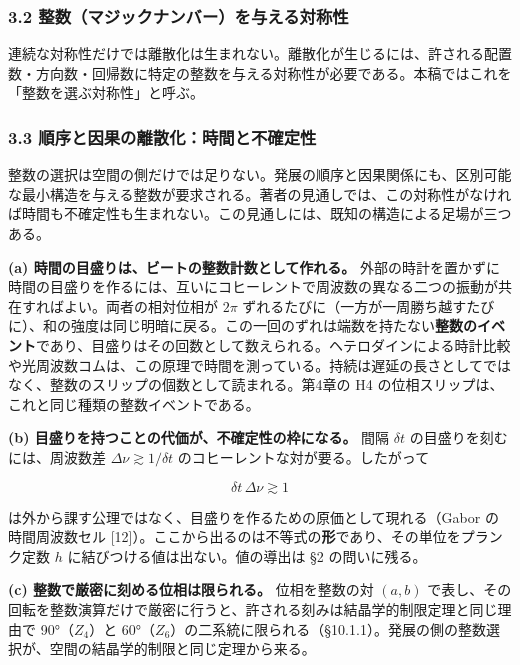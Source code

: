 \documentclass[
  a4paper,
]{ltjsarticle}
\begin{document}
\subsubsection{3.2
整数（マジックナンバー）を与える対称性}\label{ux6574ux6570ux30deux30b8ux30c3ux30afux30caux30f3ux30d0ux30fcux3092ux4e0eux3048ux308bux5bfeux79f0ux6027}

連続な対称性だけでは離散化は生まれない。離散化が生じるには、許される配置数・方向数・回帰数に特定の整数を与える対称性が必要である。本稿ではこれを「整数を選ぶ対称性」と呼ぶ。

\subsubsection{3.3
順序と因果の離散化：時間と不確定性}\label{ux9806ux5e8fux3068ux56e0ux679cux306eux96e2ux6563ux5316ux6642ux9593ux3068ux4e0dux78baux5b9aux6027}

整数の選択は空間の側だけでは足りない。発展の順序と因果関係にも、区別可能な最小構造を与える整数が要求される。著者の見通しでは、この対称性がなければ時間も不確定性も生まれない。この見通しには、既知の構造による足場が三つある。

\textbf{(a) 時間の目盛りは、ビートの整数計数として作れる。}
外部の時計を置かずに時間の目盛りを作るには、互いにコヒーレントで周波数の異なる二つの振動が共在すればよい。両者の相対位相が
\(2\pi\)
ずれるたびに（一方が一周勝ち越すたびに）、和の強度は同じ明暗に戻る。この一回のずれは端数を持たない\textbf{整数のイベント}であり、目盛りはその回数として数えられる。ヘテロダインによる時計比較や光周波数コムは、この原理で時間を測っている。持続は遅延の長さとしてではなく、整数のスリップの個数として読まれる。第4章の
H4 の位相スリップは、これと同じ種類の整数イベントである。

\textbf{(b) 目盛りを持つことの代価が、不確定性の枠になる。} 間隔
\(\delta t\) の目盛りを刻むには、周波数差 \(\Delta\nu\gtrsim1/\delta t\)
のコヒーレントな対が要る。したがって

\[
\delta t\,\Delta\nu\gtrsim1
\]

は外から課す公理ではなく、目盛りを作るための原価として現れる（Gabor
の時間周波数セル
{[}12{]}）。ここから出るのは不等式の\textbf{形}であり、その単位をプランク定数
\(h\) に結びつける値は出ない。値の導出は §2 の問いに残る。

\textbf{(c) 整数で厳密に刻める位相は限られる。} 位相を整数の対 \((a,b)\)
で表し、その回転を整数演算だけで厳密に行うと、許される刻みは結晶学的制限定理と同じ理由で
90°（\(Z_4\)）と
60°（\(Z_6\)）の二系統に限られる（§10.1.1）。発展の側の整数選択が、空間の結晶学的制限と同じ定理から来る。
\end{document}
